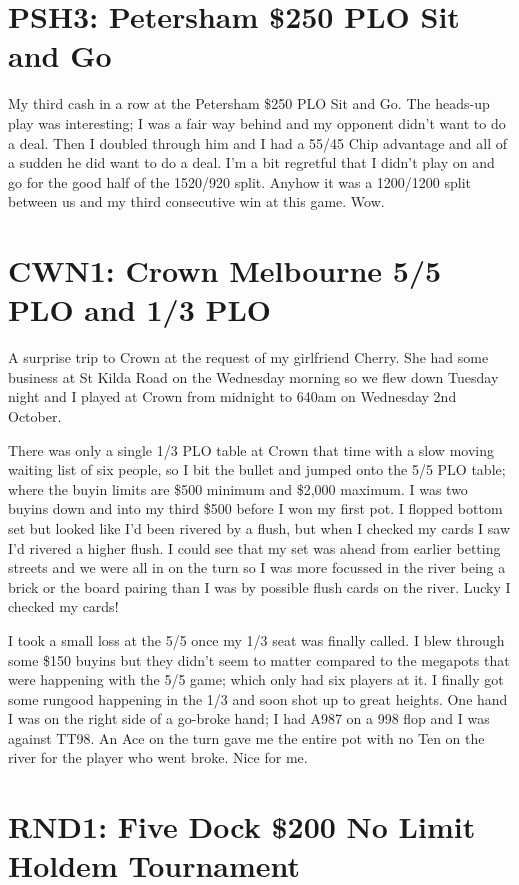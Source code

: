 \section*{PSH3: Petersham \$250 PLO Sit and Go}

My third cash in a row at the Petersham \$250 PLO Sit and Go. The
heads-up play was interesting; I was a fair way behind and my opponent
didn't want to do a deal. Then I doubled through him and I had a 55/45
Chip advantage and all of a sudden he did want to do a deal. I'm a bit
regretful that I didn't play on and go for the good half of the
1520/920 split. Anyhow it was a 1200/1200 split between us and my
third consecutive win at this game. Wow.

\section*{CWN1: Crown Melbourne 5/5 PLO and 1/3 PLO}

A surprise trip to Crown at the request of my girlfriend Cherry. She
had some business at St Kilda Road on the Wednesday morning so we flew
down Tuesday night and I played at Crown from midnight to 640am on
Wednesday 2nd October.

There was only a single 1/3 PLO table at Crown that time with a slow
moving waiting list of six people, so I bit the bullet and jumped onto
the 5/5 PLO table; where the buyin limits are \$500 minimum and
\$2,000 maximum. I was two buyins down and into my third \$500 before
I won my first pot. I flopped bottom set but looked like I'd been
rivered by a flush, but when I checked my cards I saw I'd rivered a
higher flush. I could see that my set was ahead from earlier betting
streets and we were all in on the turn so I was more focussed in the
river being a brick or the board pairing than I was by possible flush
cards on the river. Lucky I checked my cards!

I took a small loss at the 5/5 once my 1/3 seat was finally called. I
blew through some \$150 buyins but they didn't seem to matter compared
to the megapots that were happening with the 5/5 game; which only had
six players at it. I finally got some rungood happening in the 1/3 and
soon shot up to great heights. One hand I was on the right side of a
go-broke hand; I had A987 on a 998 flop and I was against TT98. An Ace
on the turn gave me the entire pot with no Ten on the river for the
player who went broke. Nice for me.

\section*{RND1: Five Dock \$200 No Limit Holdem Tournament}

